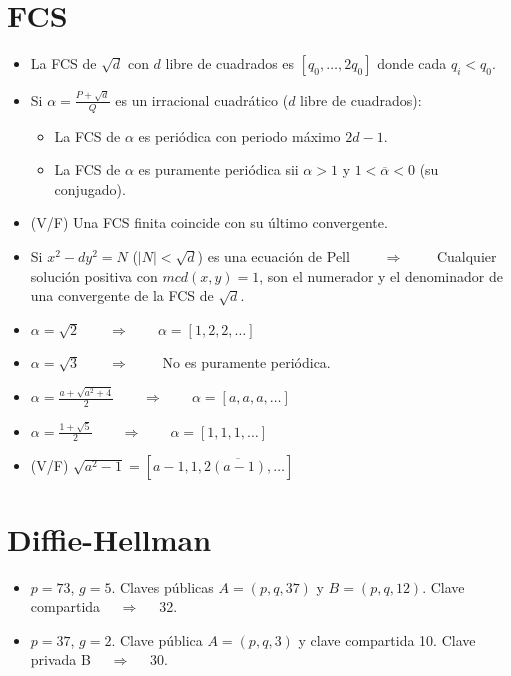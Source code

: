 \documentclass[fleqn]{article}
\def\next{\qquad \Rightarrow \qquad}
\begin{document}
    \section{FCS}
    \begin{itemize}
        \item La FCS de $\sqrt{d}$ con $d$ libre de cuadrados es $[q_0, \dots, 2q_0]$ donde cada $q_i < q_0$.
        \item Si $\alpha = \frac{P + \sqrt{d}}{Q}$ es un irracional cuadrático ($d$ libre de cuadrados): 
                \begin{itemize}
                    \item La FCS de $\alpha$ es periódica con periodo máximo $2d - 1$.
                    \item La FCS de $\alpha$ es puramente periódica sii $\alpha > 1$ y $1 < \overline{\alpha} < 0$ (su conjugado).
                \end{itemize}
        \item (V/F) Una FCS finita coincide con su último convergente.
        \item Si $x^2 - dy^2 = N$ ($|N| < \sqrt{d}$) es una ecuación de Pell $\next$ Cualquier solución positiva con $mcd(x,y) = 1$, son el numerador y el denominador de una convergente de la FCS de $\sqrt{d}$.
        \item $\alpha = \sqrt{2} \next \alpha = [1,2,2,\dots]$
        \item $\alpha = \sqrt{3} \next $ No es puramente periódica.
        \item $\alpha = \frac{a + \sqrt{a^2 + 4}}{2} \next \alpha = [a,a,a,\dots]$
        \item $\alpha = \frac{1 + \sqrt{5}}{2} \next \alpha = [1,1,1,\dots]$
        \item (V/F) $\sqrt{a^2 - 1} = [a-1, \overline{1, 2(a-1), \dots}]$
    \end{itemize}

    \section{Diffie-Hellman}
    \begin{itemize}
        \item $p = 73$, $g = 5$. Claves públicas $A = (p, q, 37)$ y $B = (p, q, 12)$. Clave compartida $\quad \Rightarrow \quad$ 32.
        \item $p = 37$, $g = 2$. Clave pública $A = (p, q, 3)$ y clave compartida 10. Clave privada B $\quad \Rightarrow \quad$ 30.
    \end{itemize}
\end{document}
